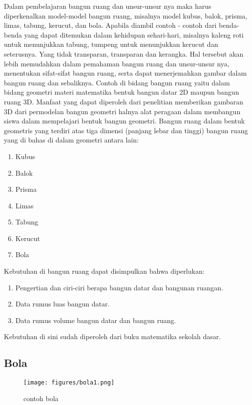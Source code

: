 Dalam pembelajaran bangun ruang dan unsur-unsur nya maka harus diperkenalkan model-model bangun ruang, misalnya model kubus, balok, prisma, limas, tabung, kerucut, dan bola. Apabila diambil contoh - contoh dari benda-benda yang dapat ditemukan dalam kehidupan sehari-hari, misalnya kaleng roti untuk menunjukkan tabung, tumpeng untuk menunjukkan kerucut dan seterusnya. Yang tidak transparan, transparan dan kerangka. Hal tersebut akan lebih memudahkan dalam pemahaman bangun ruang dan unsur-unsur nya, menentukan sifat-sifat bangun ruang, serta dapat menerjemahkan gambar dalam bangun ruang dan sebaliknya.
Contoh di bidang bangun ruang yaitu dalam bidang geometri  materi matematika bentuk bangun datar 2D maupun bangun ruang 3D. 
Manfaat yang dapat diperoleh dari penelitian memberikan gambaran 3D dari permodelan bangun geometri halnya alat peragaan dalam membangun siswa dalam mempelajari bentuk bangun geometri.
Bangun ruang dalam bentuk geometris yang terdiri atas tiga dimensi (panjang lebar dan tinggi) bangun ruang yang di bahas di dalam geometri antara lain:
\begin{enumerate}
\item Kubus
\item Balok 
\item Prisma
\item Limas
\item Tabung
\item Kerucut
\item Bola
\end{enumerate}


Kebutuhan di bangun ruang dapat disimpulkan bahwa diperlukan: 
\begin{enumerate}
\item    Pengertian dan ciri-ciri berapa bangun datar dan bangunan ruangan.
\item    Data rumus luas bangun datar.
\item    Data rumus volume bangun datar dan bangun ruang.
\end{enumerate}

Kebutuhan di sini sudah diperoleh dari buku matematika sekolah dasar.

\subsection{Bola} 

\begin{figure}[ht]
    \centering
	\texttt{[image: figures/bola1.png]}
    \caption{contoh bola}
    \label{bola1}
\end{figure}

